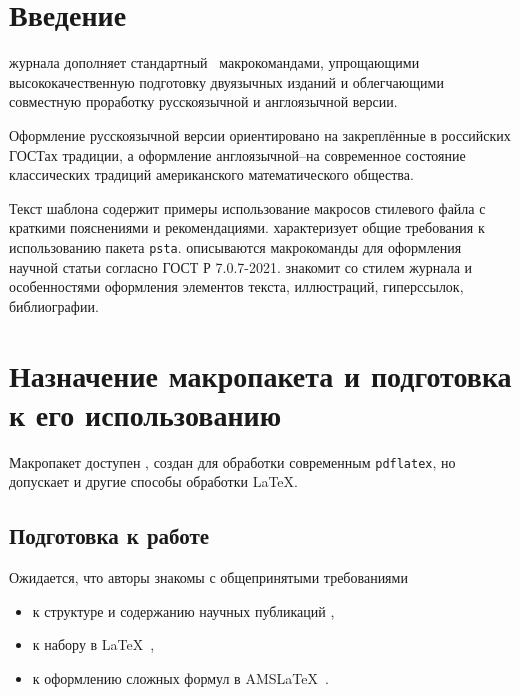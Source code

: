 \documentclass{psta}%
\title [Шаблон стилевого файла]{Готовим  в~\LaTeXe~статью в~журнал «Программные~системы: теория~и~приложения»\subtitle{ш}аблон стилевого файла}
\author{Знаменский, Сергей Витальевич}
\author{Фамилия соавтора, Имя Отчество}
\title[Template for submission]{Prepare article in \LaTeXe\subtitle (template for submission to the journal)}
\author{Znamenskij, Sergej Vital'evich}
\author{Family Name, Other Names}
\begin{document}
\Russian
\maketitle

\section*{Введение}

 журнала   дополняет стандартный \LaTeXe\ макрокомандами, упрощающими высококачественную подготовку двуязычных изданий и облегчающими совместную проработку русскоязычной и англоязычной версии.

Оформление русскоязычной версии ориентировано на закреплённые в российских ГОСТах традиции, а оформление англоязычной\---на современное состояние классических традиций американского математического общества.

Текст шаблона содержит примеры использование макросов стилевого файла с краткими пояснениями и рекомендациями.
 характеризует общие требования к использованию пакета \verb|psta|.
 описываются макрокоманды для оформления научной статьи согласно ГОСТ Р 7.0.7-2021.
 знакомит со стилем журнала и особенностями оформления элементов текста, иллюстраций, гиперссылок, библиографии.

\section{Назначение макропакета и подготовка к его использованию}\label{sec:general}
Макропакет доступен , создан для обработки современным \texttt{pdflatex}, но допускает и другие способы обработки LaTeX.

\subsection{Подготовка к работе}
Ожидается, что авторы знакомы с общепринятыми требованиями
\begin{itemize}
\item к структуре и содержанию научных публикаций \cites{Safonov2007,Fradkov2003,Sviderskaya2011,KirillovaLong,KirillovaShort},
\item к набору в \LaTeX\ \cites{Stolarov,Vorontsov,Syutkin},
\item к оформлению сложных формул в  AMS\LaTeX\ \cites{AMSshort,Mathmode}.
\end{itemize}
\end{document}
